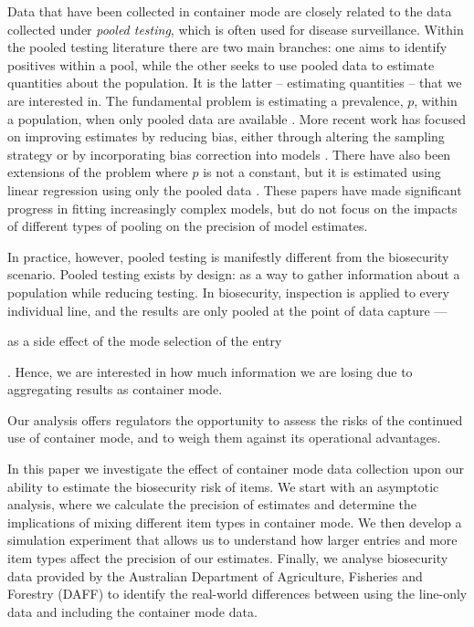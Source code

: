 \documentclass[useAMS,usenatbib,referee]{biom}
\newif\ifproofread
\newcommand{\rev}[1]{%
\ifproofread
\hl{#1}%
\else
#1%
\fi
}
\begin{document}
 Data that have been collected in container mode are closely related to the data collected under \emph{pooled testing}, which is often used for disease surveillance. Within the pooled testing literature there are two main branches: one aims to identify positives within a pool, while the other seeks to use pooled data to estimate quantities about the population. It is the latter -- estimating quantities -- that we are interested in. The fundamental problem is estimating a prevalence, \(p\), within a population, when only pooled data are available \citep{thompson_estimation_1962}. More recent work has focused on improving estimates by reducing bias, either through altering the sampling strategy \citep{schaarschmidt_experimental_2007,hepworth_debiased_2009} or by incorporating bias correction into models  \citep{hepworth_bias_2017,hepworth_bias_2021}. There have also been extensions of the problem where \(p\) is not a constant, but it is estimated using linear regression using only the pooled data \citep{delaigle_nonparametric_2015, chatterjee_regression_2020, mcmahan_bayesian_2017, liu_generalized_2020}. These papers have made significant progress in fitting increasingly complex models, but do not focus on the impacts of different types of pooling on the precision of model estimates.

In practice, however, pooled testing is manifestly different from the biosecurity scenario. Pooled testing exists by design: as a way to gather information about a population while reducing testing. In biosecurity, inspection is applied to every individual line, and the results are only pooled at the point of data capture --- \rev{as a side effect of the mode selection of the entry}. Hence, we are interested in how much information we are losing due to aggregating results as container mode. \rev{Our analysis offers regulators the opportunity to assess the risks of the continued use of container mode, and to weigh them against its operational advantages.}

In this paper we investigate the effect of container mode data collection upon our ability to estimate the biosecurity risk of items. We start with an asymptotic analysis, where we calculate the precision of estimates and determine the implications of mixing different item types in container mode. We then develop a simulation experiment that allows us to understand how larger entries and more item types affect the precision of our estimates. Finally, we analyse biosecurity data provided by the Australian Department of Agriculture, Fisheries and Forestry (DAFF) to identify the real-world differences between using the line-only data and including the container mode data.
\end{document}
